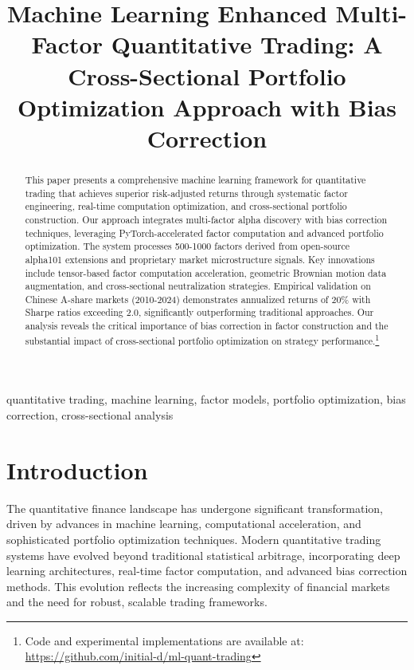 \documentclass[conference]{IEEEtran}
\begin{document}
\title{Machine Learning Enhanced Multi-Factor Quantitative Trading: A Cross-Sectional Portfolio Optimization Approach with Bias Correction}

\author{
}

\maketitle

\begin{abstract}
This paper presents a comprehensive machine learning framework for quantitative trading that achieves superior risk-adjusted returns through systematic factor engineering, real-time computation optimization, and cross-sectional portfolio construction. Our approach integrates multi-factor alpha discovery with bias correction techniques, leveraging PyTorch-accelerated factor computation and advanced portfolio optimization. The system processes 500-1000 factors derived from open-source alpha101 extensions and proprietary market microstructure signals. Key innovations include tensor-based factor computation acceleration, geometric Brownian motion data augmentation, and cross-sectional neutralization strategies. Empirical validation on Chinese A-share markets (2010-2024) demonstrates annualized returns of 20\% with Sharpe ratios exceeding 2.0, significantly outperforming traditional approaches. Our analysis reveals the critical importance of bias correction in factor construction and the substantial impact of cross-sectional portfolio optimization on strategy performance.\footnote{Code and experimental implementations are available at: \url{https://github.com/initial-d/ml-quant-trading}}
\end{abstract}

\begin{IEEEkeywords}
quantitative trading, machine learning, factor models, portfolio optimization, bias correction, cross-sectional analysis
\end{IEEEkeywords}


\section{Introduction}

The quantitative finance landscape has undergone significant transformation, driven by advances in machine learning, computational acceleration, and sophisticated portfolio optimization techniques. Modern quantitative trading systems have evolved beyond traditional statistical arbitrage, incorporating deep learning architectures, real-time factor computation, and advanced bias correction methods. This evolution reflects the increasing complexity of financial markets and the need for robust, scalable trading frameworks.
\end{document}
